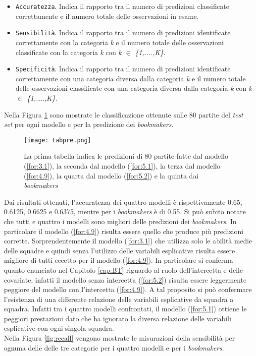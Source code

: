 \begin{itemize}
	\item \texttt{Accuratezza}. Indica il rapporto tra il numero di predizioni classificate correttamente e il numero totale delle osservazioni in esame.
	\item \texttt{Sensibilità}. Indica il rapporto tra il numero di predizioni identificate correttamente con la categoria \emph{k} e il numero totale delle osservazioni classificate con la categoria \emph{k} con \emph{k $\in$ \{1,....,K\}}.
	\item \texttt{Specificità}. Indica il rapporto tra il numero di predizioni identificate correttamente con una categoria diversa dalla categoria \emph{k} e il numero totale delle osservazioni classificate con una categoria diversa dalla categoria \emph{k} con \emph{k $\in$ \{1,....,K\}}.
\end{itemize}
Nella Figura \ref{fig:pre} sono mostrate le classificazione ottenute sulle 80 partite del \emph{test set} per ogni modello e per la predizione dei \emph{bookmakers}.
\begin{figure}[htbp]
	\begin{center}
		\texttt{[image: tabpre.png]}
		\caption{La prima tabella indica le predizioni di 80 partite fatte dal modello (\ref{for:3.1}), la seconda dal modello (\ref{for:5.1}), la terza dal modello (\ref{for:4.9}), la quarta dal modello (\ref{for:5.2}) e la quinta dai \emph{bookmakers}
			\label{fig:pre}}
	\end{center}
\end{figure}

Dai risultati ottenuti, l'accuratezza dei quattro modelli è rispettivamente 0.65, 0.6125, 0.6625 e 0.6375, mentre per i \emph{bookmakers} è di 0.55. Si può subito notare che tutti e quattro i modelli sono migliori delle predizioni dei \emph{bookmakers}. In particolare il modello (\ref{for:4.9}) risulta essere quello che produce più predizioni corrette. Sorprendentemente il modello (\ref{for:3.1}) che utilizza solo le abilità medie delle squadre e quindi senza l'utilizzo delle variabili esplicative risulta essere migliore di tutti eccetto per il modello (\ref{for:4.9}). In particolare si conferma quanto enunciato nel Capitolo \ref{cap:BT} riguardo al ruolo dell'intercetta e delle covariate, infatti il modello senza intercetta (\ref{for:5.2}) risulta essere leggermente peggiore del modello con l'intercetta (\ref{for:4.9}). A tal proposito si può confermare l'esistenza di una differente relazione delle variabili esplicative da squadra a squadra. Infatti tra i quattro modelli confrontati, il modello (\ref{for:5.1}) ottiene le peggiori prestazioni dato che ha ignorato la diversa relazione delle variabili esplicative con ogni singola squadra.\\
Nella Figura \ref{fig:recall} vengono mostrate le misurazioni della sensibilità per ognuna delle delle tre categorie per i quattro modelli e per i \emph{bookmakers}.\\


